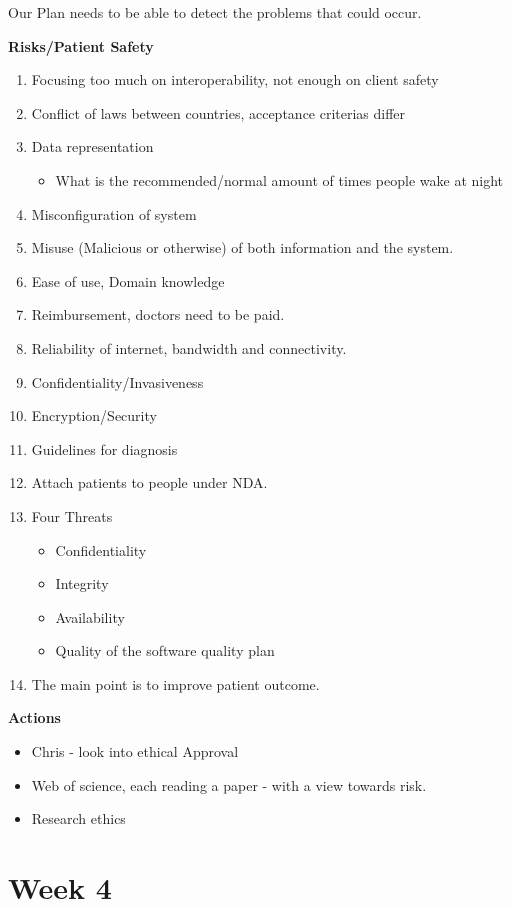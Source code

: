 Our Plan needs to be able to detect the problems that could occur.


\textbf{Risks/Patient Safety}
\begin{enumerate}
\item Focusing too much on interoperability, not enough on client safety
\item Conflict of laws between countries, acceptance criterias differ
\item Data representation
\begin{itemize}
\item What is the recommended/normal amount of times people wake at night
\end{itemize} 
\item Misconfiguration of system
\item Misuse (Malicious or otherwise) of both information and the system.
\item Ease of use, Domain knowledge
\item Reimbursement, doctors need to be paid.
\item Reliability of internet, bandwidth and connectivity.
\item Confidentiality/Invasiveness
\item Encryption/Security
\item Guidelines for diagnosis
\item Attach patients to people under NDA.
\item Four Threats
\begin{itemize}
\item Confidentiality
\item Integrity
\item Availability
\item Quality of the software quality plan
\end{itemize}
\item The main point is to improve patient outcome.
\end{enumerate}

\textbf{Actions}
\begin{itemize}
\item Chris - look into ethical Approval
\item Web of science, each reading a paper - with a view towards risk.
\item Research ethics
\end{itemize}

\chapter{Week 4}

